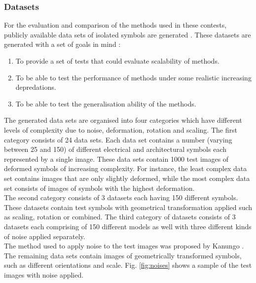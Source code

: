 \subsubsection{Datasets}
    
For the evaluation and comparison of the methods used in these contests, publicly available data sets of isolated symbols are generated \cite{Delalandre_contest} \cite{Delalandre_sketched}. These datasets are generated with a set of goals in mind \cite{Delalandre_contest}:

   \begin{enumerate}
        \item To provide a set of tests that could evaluate scalability of methods.
        \item To be able to test the performance of methods under some realistic increasing depredations.
        \item  To be able to test the generalisation ability of the methods.
    \end{enumerate}

The generated data sets are organised into four categories which have different levels of complexity due to noise, deformation, rotation and scaling. The first category consists of 24 data sets. Each data set contains a number (varying between 25 and 150) of different electrical and architectural symbols each represented by a single image. These data sets contain 1000 test images of deformed symbols of increasing complexity. For instance, the least complex data set contains images that are only slightly deformed, while the most complex data set consists of images of symbols with the highest deformation.\\

The second category consists of 3 datasets each having 150 different symbols. These datasets contain test symbols with geometrical transformation applied such as scaling, rotation or combined. The third category of datasets consists of 3 datasets each comprising of 150 different models as well with three different kinds of noise applied separately. \\

The method used to apply noise to the test images was proposed by Kanungo \cite{888707}. The remaining data sets contain images of geometrically transformed symbols, such as different orientations and scale. Fig. \ref{fig:noises} shows a sample of the test images with noise applied.

